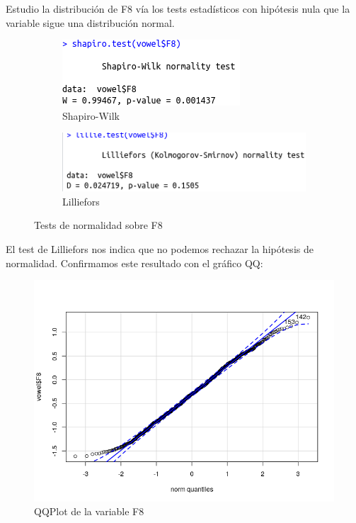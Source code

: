 Estudio la distribución de F8 vía los tests estadísticos con hipótesis nula que la variable sigue una distribución normal.

\begin{figure}[H]
	\centering
	\begin{subfigure}{.5\textwidth}
		\centering
		\includegraphics[width=.7\linewidth]{sw-F8.png}
		\caption{Shapiro-Wilk}
		\label{fig:sw-F8}
	\end{subfigure}%
	\begin{subfigure}{.5\textwidth}
		\centering
		\includegraphics[width=.7\linewidth]{l-F8.png}
		\caption{Lilliefors}
		\label{fig:l-F8}
	\end{subfigure}
	\caption{Tests de normalidad sobre F8}
	\label{fig:normF8}
\end{figure}

El test de Lilliefors nos indica que no podemos rechazar la hipótesis de normalidad. Confirmamos este resultado con el gráfico QQ:

\begin{figure}[H] %
	\centering
	\includegraphics[scale=0.6]{qq-F8.png}  %
	\caption{QQPlot de la variable F8} 
	\label{fig:qq-F8}
\end{figure}

